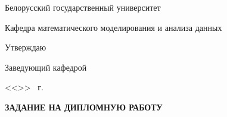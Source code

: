 \documentclass[../main.tex]{subfiles}
\begin{document}
	
	\begin{center}
		Белорусский государственный университет
	\end{center}
		
	\vspace{1em}

	\begin{flushleft}
		\begin{minipage}[H]{0.9\textwidth}
			\begin{flushleft}
				Кафедра математического моделирования и анализа данных
				
				\vspace{1em}
				
				Утверждаю

				\vspace{1em}

				Заведующий кафедрой \makebox[6cm]{\hrulefill}

				\vspace{1em}
				
				<<\makebox[1cm]{\hrulefill}>> \makebox[3cm]{\hrulefill} \the\year\, г.
			\end{flushleft}
		\end{minipage}
	\end{flushleft}	
		
	\vspace{2em}
		
	\begin{center}
		\textbf{ЗАДАНИЕ НА ДИПЛОМНУЮ РАБОТУ}
	\end{center}
	
	\vspace{0.5em}
	
\end{document}
